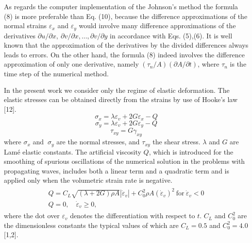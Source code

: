    As regards the computer implementation of the Johnson's method the formula
(8) is more preferable than Eq. (10), because the difference approximations
of the normal strains $\varepsilon_x$ and $\varepsilon_y$ would
involve many difference approximations of the derivatives $\partial u/\partial
x,~\partial v/\partial x,\ldots,\partial v/\partial y$ in accordance with
Eqs. (5),(6). It is well known that the approximation of the derivatives by
the divided differences always leads to errors. On the other hand, the
formula (8) indeed involves the difference approximation of only one
derivative, namely $(\tau_n/A)(\partial A/\partial t)$, where $\tau_n$ is
the time step of the numerical method.

   In the present work we consider only the regime of elastic deformation. The
elastic stresses can be obtained directly from the strains by use of Hooke's
law [12].
\begin{equation}
\sigma_x=\lambda\varepsilon_v + 2G\varepsilon_x - Q
\end{equation}
\begin{equation}
\sigma_y=\lambda\varepsilon_v + 2G\varepsilon_y - Q
\end{equation}
\begin{equation}
\tau_{xy}=G\gamma_{xy}
\end{equation}
where $\sigma_x$ and $~\sigma_y$ are the normal stresses, and $\tau_{xy}$
the shear stress. $\lambda$ and $G$ are Lam\'{e} elastic constants. The
artificial viscosity $Q$, which is introduced for the smoothing of spurious
oscillations of the numerical solution in the problems with propagating
waves, includes both a linear term and a quadratic term and is applied only
when the volumetric strain rate is negative.
\begin{eqnarray}
\begin{array}{l}
Q = C_L\sqrt{(\lambda+2G)\rho A}|\dot{\varepsilon}_v| +
C_0^2\rho A(\dot{\varepsilon}_v)^2
~\mbox{for}~\dot{\varepsilon}_v < 0\\
Q = 0,\quad \dot{\varepsilon}_v\geq 0,
\end{array}
\end{eqnarray}
where the dot over $\varepsilon_v$ denotes the differentiation with respect to
$t$. $C_L$ and $C_0^2$ are the dimensionless constants
the typical values of which are $C_L=0.5$ and $C_0^2=4.0$ [1,2].

